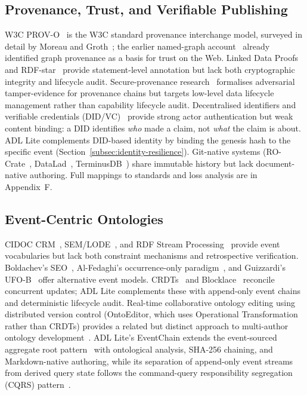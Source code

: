 \subsection{Provenance, Trust, and Verifiable Publishing}\label{subsec:provenance-trust}

W3C PROV-O~\cite{w3c_prov_o} is the W3C standard provenance interchange model, surveyed in detail by Moreau and Groth~\cite{moreau2013prov}; the earlier named-graph account~\cite{carroll2005namedgraphs} already identified graph provenance as a basis for trust on the Web. Linked Data Proofs~\cite{linked_data_proofs} and RDF-star~\cite{rdf_star} provide statement-level annotation but lack both cryptographic integrity and lifecycle audit. Secure-provenance research~\cite{braun2010secure,hasan2009preventing} formalises adversarial tamper-evidence for provenance chains but targets low-level data lifecycle management rather than capability lifecycle audit. Decentralised identifiers and verifiable credentials (DID/VC)~\cite{mazzocca2024didvc} provide strong actor authentication but weak content binding: a DID identifies \emph{who} made a claim, not \emph{what} the claim is about. ADL Lite complements DID-based identity by binding the genesis hash to the specific event (Section~\ref{subsec:identity-resilience}). Git-native systems (RO-Crate~\cite{ro_crate}, DataLad~\cite{datalad}, TerminusDB~\cite{terminusdb}) share immutable history but lack document-native authoring. Full mappings to standards and loss analysis are in Appendix~F.

\subsection{Event-Centric Ontologies}\label{subsec:event-centric}

CIDOC CRM~\cite{cidoc_crm}, SEM/LODE~\cite{vanhage2011sem,shaw2011lode}, and RDF Stream Processing~\cite{w3c_rsp,c_sparql,lephuoc2011cqels} provide event vocabularies but lack both constraint mechanisms and retrospective verification. Boldachev's SEO~\cite{boldachev2025seo}, Al-Fedaghi's occurrence-only paradigm~\cite{alfedaghi2024occurrence}, and Guizzardi's UFO-B~\cite{guizzardi2024ufob} offer alternative event models. CRDTs~\cite{crdts,automerge,yjs,crdt_rdf_2023,nieto2024crdt} and Blocklace~\cite{blocklace2024} reconcile concurrent updates; ADL Lite complements these with append-only event chains and deterministic lifecycle audit. Real-time collaborative ontology editing using distributed version control (OntoEditor, which uses Operational Transformation rather than CRDTs) provides a related but distinct approach to multi-author ontology development~\cite{hemid2024ontoeditor}. ADL Lite's EventChain extends the event-sourced aggregate root pattern~\cite{event_sourcing,event_sourcing_fowler} with ontological analysis, SHA-256 chaining, and Markdown-native authoring, while its separation of append-only event streams from derived query state follows the command-query responsibility segregation (CQRS) pattern~\cite{cqrs}.

